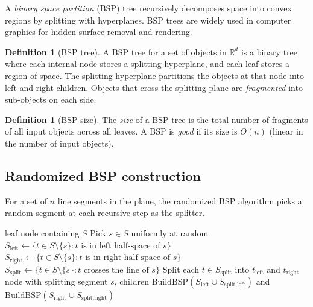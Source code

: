 \documentclass[twoside,12pt]{book}
\theoremstyle{plain}
\theoremstyle{definition}
\newtheorem{definition}[theorem]{Definition}
\theoremstyle{remark}
\begin{document}
A \emph{binary space partition} (BSP) tree recursively decomposes space into convex regions by splitting with hyperplanes. BSP trees are widely used in computer graphics for hidden surface removal and rendering.

\begin{definition}[BSP tree]
A BSP tree for a set of objects in $\mathbb{R}^d$ is a binary tree where each internal node stores a splitting hyperplane, and each leaf stores a region of space. The splitting hyperplane partitions the objects at that node into left and right children. Objects that cross the splitting plane are \emph{fragmented} into sub-objects on each side.
\end{definition}

\begin{definition}[BSP size]
The \emph{size} of a BSP tree is the total number of fragments of all input objects across all leaves. A BSP is \emph{good} if its size is $O(n)$ (linear in the number of input objects).
\end{definition}

\subsection{Randomized BSP construction}

For a set of $n$ line segments in the plane, the randomized BSP algorithm picks a random segment at each recursive step as the splitter.

\begin{algorithm}
\caption{Randomized BSP for Line Segments}
\label{alg:bsp}
\begin{algorithmic}[1]
        \State \Return leaf node containing $S$
    \EndIf
    \State Pick $s \in S$ uniformly at random
    \State $S_{\text{left}} \leftarrow \{t \in S \setminus \{s\} : t \text{ is in left half-space of } s\}$
    \State $S_{\text{right}} \leftarrow \{t \in S \setminus \{s\} : t \text{ is in right half-space of } s\}$
    \State $S_{\text{split}} \leftarrow \{t \in S \setminus \{s\} : t \text{ crosses the line of } s\}$
    \State Split each $t \in S_{\text{split}}$ into $t_{\text{left}}$ and $t_{\text{right}}$
    \State \Return node with splitting segment $s$, children $\text{BuildBSP}(S_{\text{left}} \cup S_{\text{split,left}})$ and $\text{BuildBSP}(S_{\text{right}} \cup S_{\text{split,right}})$
\EndFunction
\end{algorithmic}
\end{algorithm}
\end{document}
